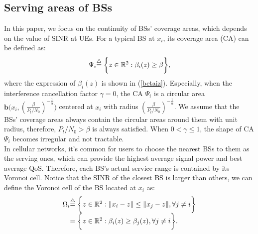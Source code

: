 \documentclass[final]{IEEEtran}
\begin{document}
\subsection{Serving areas of BSs}
\indent In this paper, we focus on the continuity of BSs' coverage areas, which depends on the value of SINR at UEs. For a typical BS at $x_i$, its coverage area (CA) can be defined as:
\begin{equation}
\begin{array}{r@{}l}
    \Psi_i
    &\overset{\triangle}{=}\bigg\{z\in\mathbb{R}^2:\beta_i(z)\geq\beta\bigg\},
\label{CA}
\end{array}
\end{equation}
where the expression of $\beta_i(z)$ is shown in (\ref{betaiz}). Especially, when the interference cancellation factor $\gamma=0$, the CA $\Psi_i$ is a circular area $\textbf{b}\big(x_i,(\frac{\beta}{P_t/N_0})^{-\frac{1}{\alpha}}\big)$ centered at $x_i$ with radius $(\frac{\beta}{P_t/N_0})^{-\frac{1}{\alpha}}$. We assume that the BSs' coverage areas always contain the circular areas around them with unit radius, therefore, ${P_t}/{N_0}>\beta$ is always satisfied. When $0<\gamma\leq 1$, the shape of CA $\Psi_i$ becomes irregular and not tractable.\\
\indent In cellular networks, it's common for users to choose the nearest BSs to them as the serving ones, which can provide the highest average signal power and best average QoS. Therefore, each BS's actual service range is contained by its Voronoi cell. Notice that the SINR of the closest BS is larger than others, we can define the Voronoi cell of the BS located at $x_i$ as:
\begin{equation}
\begin{array}{r@{}l}
    \Omega_i&\overset{\triangle}{=}\bigg\{z\in\mathbb{R}^2:\|x_i-z\|\leq \|x_j-z\|,\forall j\neq i\bigg\}\\
    &=\bigg\{z\in\mathbb{R}^2:\beta_i(z)\geq\beta_j(z),\forall j\neq i\bigg\}.
\end{array}
\end{equation}
\end{document}
